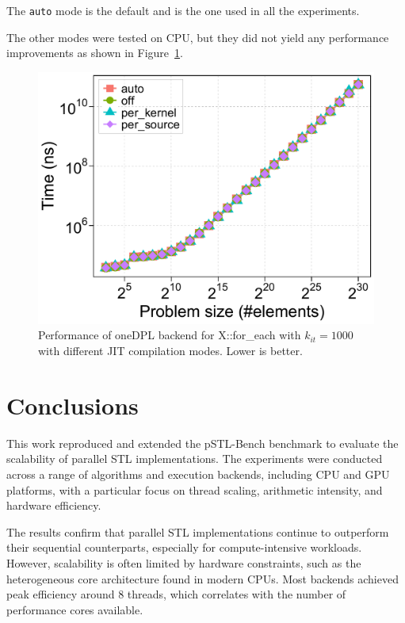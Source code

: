 \documentclass[sigconf]{acmart}
\begin{document}
The \texttt{auto} mode is the default and is the one used in all the
experiments.

The other modes were tested on CPU, but they did not yield any performance
improvements as shown in Figure~\ref{fig:oneDPL_jit_modes}.

\begin{figure}[H]
      \centering
      \includegraphics[width=\linewidth]{figures/problemSize_time_onedpl-cpu_jit-for_each-k1000}
      \caption{Performance of oneDPL backend for X::for\_each with $k_{it} = 1000$ with different JIT compilation modes. Lower is better.}\label{fig:oneDPL_jit_modes}
\end{figure}

\section{Conclusions}

This work reproduced and extended the pSTL-Bench benchmark to evaluate the
scalability of parallel STL implementations. The experiments were conducted
across a range of algorithms and execution backends, including CPU and GPU
platforms, with a particular focus on thread scaling, arithmetic intensity, and
hardware efficiency.

The results confirm that parallel STL implementations continue to outperform
their sequential counterparts, especially for compute-intensive workloads.
However, scalability is often limited by hardware constraints, such as the
heterogeneous core architecture found in modern CPUs. Most backends achieved
peak efficiency around 8 threads, which correlates with the number of
performance cores available.
\end{document}
